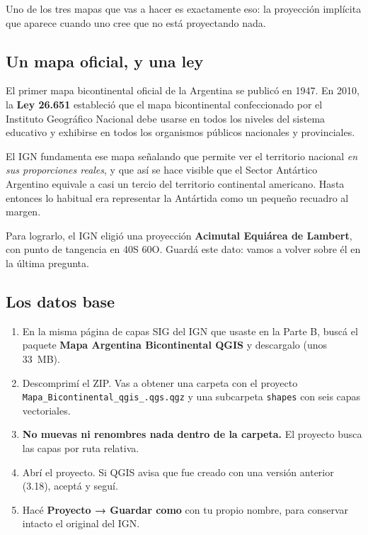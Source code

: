 \documentclass{article}
\begin{document}
Uno de los tres mapas que vas a hacer es exactamente eso: la proyección implícita que aparece cuando uno cree que no está proyectando nada.

\subsection{Un mapa oficial, y una ley}

El primer mapa bicontinental oficial de la Argentina se publicó en 1947. En 2010, la \textbf{Ley 26.651} estableció que el mapa bicontinental confeccionado por el Instituto Geográfico Nacional debe usarse en todos los niveles del sistema educativo y exhibirse en todos los organismos públicos nacionales y provinciales.

El IGN fundamenta ese mapa señalando que permite ver el territorio nacional \emph{en sus proporciones reales}, y que así se hace visible que el Sector Antártico Argentino equivale a casi un tercio del territorio continental americano. Hasta entonces lo habitual era representar la Antártida como un pequeño recuadro al margen.

Para lograrlo, el IGN eligió una proyección \textbf{Acimutal Equiárea de Lambert}, con punto de tangencia en 40\textdegree S 60\textdegree O. Guardá este dato: vamos a volver sobre él en la última pregunta.

\subsection{Los datos base}

\begin{enumerate}
    \item En la misma página de capas SIG del IGN que usaste en la Parte B, buscá el paquete \textbf{Mapa Argentina Bicontinental QGIS} y descargalo (unos 33~MB).
    \item Descomprimí el ZIP. Vas a obtener una carpeta con el proyecto \texttt{Mapa\_Bicontinental\_qgis\_.qgs.qgz} y una subcarpeta \texttt{shapes} con seis capas vectoriales.
    \item \textbf{No muevas ni renombres nada dentro de la carpeta.} El proyecto busca las capas por ruta relativa.
    \item Abrí el proyecto. Si QGIS avisa que fue creado con una versión anterior (3.18), aceptá y seguí.
    \item Hacé \textbf{Proyecto → Guardar como} con tu propio nombre, para conservar intacto el original del IGN.
\end{enumerate}
\end{document}

